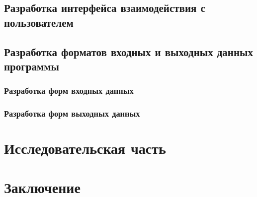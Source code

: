 \documentclass[russian,utf8,emptystyle]{eskdtext}
\begin{document}
\subsection{Разработка интерфейса взаимодействия с пользователем}

\subsection{Разработка форматов входных и выходных данных программы}
\subsubsection{Разработка форм входных данных}

\subsubsection{Разработка форм выходных данных}

\newpage
\section{Исследовательская часть}

\newpage
\section{Заключение}

\newpage
\end{document}
